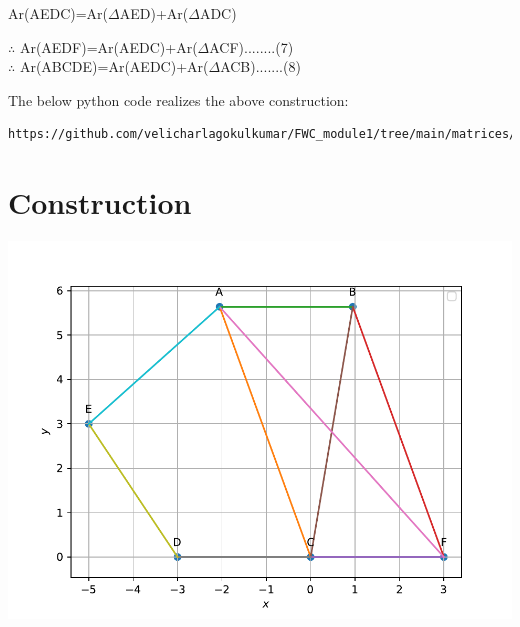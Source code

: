 \documentclass[10pt, a4paper]{article}
\begin{document}
	\begin{center}
	 		Ar(AEDC)=Ar($\Delta$AED)+Ar($\Delta$ADC)\\
	\end{center}
	\begin{center}
$\therefore$ Ar(AEDF)=Ar(AEDC)+Ar($\Delta$ACF)........(7)\\
$\therefore$ Ar(ABCDE)=Ar(AEDC)+Ar($\Delta$ACB).......(8)\\	\end{center}
The below python code realizes the above construction:	
\begin{lstlisting}
https://github.com/velicharlagokulkumar/FWC_module1/tree/main/matrices/lines/codes/matrix.py
\end{lstlisting}
 \section{Construction}
 	\begin{center}
  \includegraphics[scale=0.46]{matrix.pdf}
  	\end{center}

\end{document}
